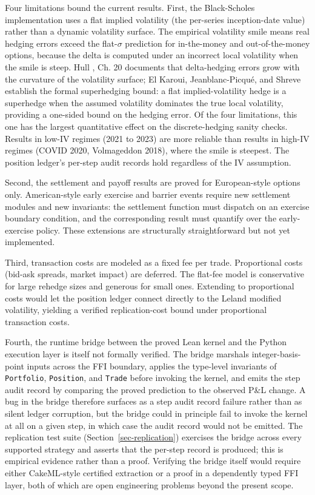 \documentclass[
  11pt,
  letterpaper,
  DIV=12,
  numbers=noendperiod]{scrartcl}
\numberwithin{equation}{section}
\numberwithin{figure}{section}
\numberwithin{table}{section}
\begin{document}
Four limitations bound the current results. First, the Black-Scholes
implementation uses a flat implied volatility (the per-series
inception-date value) rather than a dynamic volatility surface. The
empirical volatility smile means real hedging errors exceed the
flat-\(\sigma\) prediction for in-the-money and out-of-the-money
options, because the delta is computed under an incorrect local
volatility when the smile is steep. Hull
, Ch. 20 documents that delta-hedging
errors grow with the curvature of the volatility surface; El Karoui,
Jeanblanc-Picqué, and Shreve 
establish the formal superhedging bound: a flat implied-volatility hedge
is a superhedge when the assumed volatility dominates the true local
volatility, providing a one-sided bound on the hedging error. Of the
four limitations, this one has the largest quantitative effect on the
discrete-hedging sanity checks. Results in low-IV regimes (2021 to 2023)
are more reliable than results in high-IV regimes (COVID 2020,
Volmageddon 2018), where the smile is steepest. The position ledger's
per-step audit records hold regardless of the IV assumption.

Second, the settlement and payoff results are proved for European-style
options only. American-style early exercise and barrier events require
new settlement modules and new invariants: the settlement function must
dispatch on an exercise boundary condition, and the corresponding result
must quantify over the early-exercise policy. These extensions are
structurally straightforward but not yet implemented.

Third, transaction costs are modeled as a fixed fee per trade.
Proportional costs (bid-ask spreads, market impact) are deferred. The
flat-fee model is conservative for large rehedge sizes and generous for
small ones. Extending to proportional costs would let the position
ledger connect directly to the Leland 
modified volatility, yielding a verified replication-cost bound under
proportional transaction costs.

Fourth, the runtime bridge between the proved Lean kernel and the Python
execution layer is itself not formally verified. The bridge marshals
integer-basis-point inputs across the FFI boundary, applies the
type-level invariants of \texttt{Portfolio}, \texttt{Position}, and
\texttt{Trade} before invoking the kernel, and emits the step audit
record by comparing the proved prediction to the observed P\&L change. A
bug in the bridge therefore surfaces as a step audit record failure
rather than as silent ledger corruption, but the bridge could in
principle fail to invoke the kernel at all on a given step, in which
case the audit record would not be emitted. The replication test suite
(Section~\ref{sec-replication}) exercises the bridge across every
supported strategy and asserts that the per-step record is produced;
this is empirical evidence rather than a proof. Verifying the bridge
itself would require either CakeML-style certified extraction
 or a proof in a
dependently typed FFI layer, both of which are open engineering problems
beyond the present scope.
\end{document}
